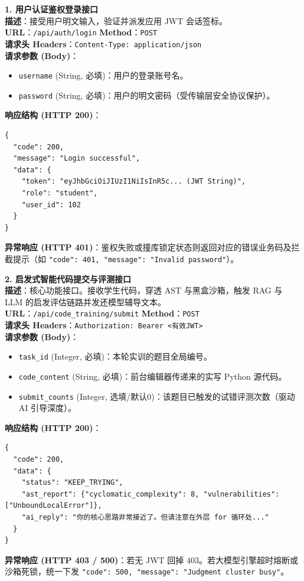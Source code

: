 \vspace{1em}
\noindent\textbf{1. 用户认证鉴权登录接口}\\
\textbf{描述}：接受用户明文输入，验证并派发应用 JWT 会话签标。\\
\textbf{URL}：\texttt{/api/auth/login} \quad \textbf{Method}：\texttt{POST} \\
\textbf{请求头 Headers}：\texttt{Content-Type: application/json} \\
\textbf{请求参数 (Body)}：
\begin{itemize}
    \item \texttt{username} (String, 必填)：用户的登录账号名。
    \item \texttt{password} (String, 必填)：用户的明文密码（受传输层安全协议保护）。
\end{itemize}
\textbf{响应结构 (HTTP 200)}：
\begin{verbatim}
{
  "code": 200,
  "message": "Login successful",
  "data": {
    "token": "eyJhbGciOiJIUzI1NiIsInR5c... (JWT String)",
    "role": "student",
    "user_id": 102
  }
}
\end{verbatim}
\textbf{异常响应 (HTTP 401)}：鉴权失败或撞库锁定状态则返回对应的错误业务码及拦截提示（如 \texttt{"code": 401, "message": "Invalid password"}）。

\vspace{1em}
\noindent\textbf{2. 启发式智能代码提交与评测接口}\\
\textbf{描述}：核心功能接口。接收学生代码，穿透 AST 与黑盒沙箱，触发 RAG 与 LLM 的启发评估链路并发还模型辅导文本。 \\
\textbf{URL}：\texttt{/api/code\_training/submit} \quad \textbf{Method}：\texttt{POST} \\
\textbf{请求头 Headers}：\texttt{Authorization: Bearer <有效JWT>} \\
\textbf{请求参数 (Body)}：
\begin{itemize}
    \item \texttt{task\_id} (Integer, 必填)：本轮实训的题目全局编号。
    \item \texttt{code\_content} (String, 必填)：前台编辑器传递来的实写 Python 源代码。
    \item \texttt{submit\_counts} (Integer, 选填/默认0)：该题目已触发的试错评测次数（驱动 AI 引导深度）。
\end{itemize}
\textbf{响应结构 (HTTP 200)}：
\begin{verbatim}
{
  "code": 200,
  "data": {
    "status": "KEEP_TRYING",
    "ast_report": {"cyclomatic_complexity": 8, "vulnerabilities": ["UnboundLocalError"]},
    "ai_reply": "你的核心思路非常接近了。但请注意在外层 for 循环处..."
  }
}
\end{verbatim}
\textbf{异常响应 (HTTP 403 / 500)}：若无 JWT 回掉 403。若大模型引擎超时熔断或沙箱死锁，统一下发 \texttt{"code": 500, "message": "Judgment cluster busy"}。

